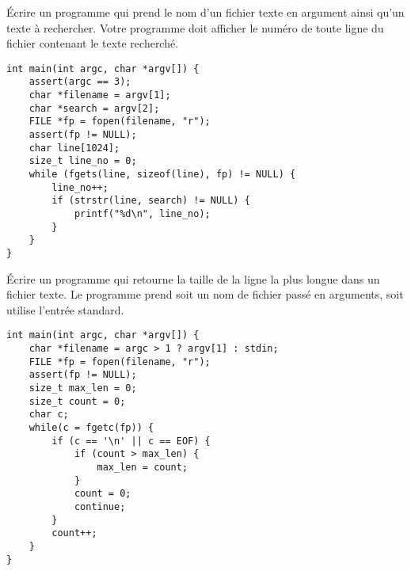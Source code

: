 \documentclass[french,a4paper,addpoints,11pt]{exam}
\begin{document}
\begin{questions}
\question Écrire un programme qui prend le nom d'un fichier texte en argument ainsi qu'un texte à rechercher. Votre programme doit afficher le numéro de toute ligne du fichier contenant le texte recherché.

\begin{solutionordottedlines}[10cm]
\begin{lstlisting}
int main(int argc, char *argv[]) {
    assert(argc == 3);
    char *filename = argv[1];
    char *search = argv[2];
    FILE *fp = fopen(filename, "r");
    assert(fp != NULL);
    char line[1024];
    size_t line_no = 0;
    while (fgets(line, sizeof(line), fp) != NULL) {
        line_no++;
        if (strstr(line, search) != NULL) {
            printf("%d\n", line_no);
        }
    }
}
\end{lstlisting}
\end{solutionordottedlines}

\question Écrire un programme qui retourne la taille de la ligne la plus longue dans un fichier texte. Le programme prend soit un nom de fichier passé en arguments, soit utilise l'entrée standard.

\begin{solutionordottedlines}[10cm]
\begin{lstlisting}
int main(int argc, char *argv[]) {
    char *filename = argc > 1 ? argv[1] : stdin;
    FILE *fp = fopen(filename, "r");
    assert(fp != NULL);
    size_t max_len = 0;
    size_t count = 0;
    char c;
    while(c = fgetc(fp)) {
        if (c == '\n' || c == EOF) {
            if (count > max_len) {
                max_len = count;
            }
            count = 0;
            continue;
        }
        count++;
    }
}
\end{lstlisting}
\end{solutionordottedlines}


\end{questions}
\end{document}
